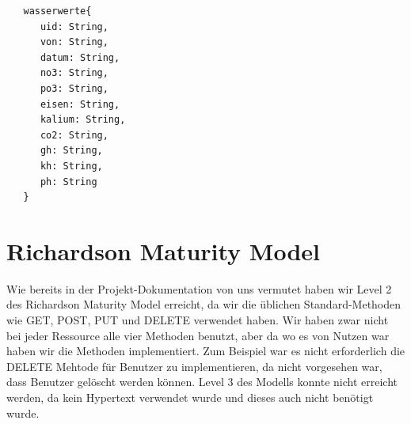\begin{lstlisting}
   wasserwerte{
      uid: String,
      von: String,
      datum: String,
      no3: String,
      po3: String,
      eisen: String,
      kalium: String,
      co2: String,
      gh: String,
      kh: String,
      ph: String
   }
\end{lstlisting}

\section{Richardson Maturity Model}

Wie bereits in der Projekt-Dokumentation von uns vermutet haben wir Level 2 des Richardson Maturity Model erreicht, da wir die üblichen Standard-Methoden wie GET, POST, PUT und DELETE verwendet haben. Wir haben zwar nicht bei jeder Ressource alle vier Methoden benutzt, aber da wo es von Nutzen war haben wir die Methoden implementiert. Zum Beispiel war es nicht erforderlich die DELETE Mehtode für Benutzer zu implementieren, da nicht vorgesehen war, dass Benutzer gelöscht werden können. Level 3 des Modells konnte nicht erreicht werden, da kein Hypertext verwendet wurde und dieses auch nicht benötigt wurde.



